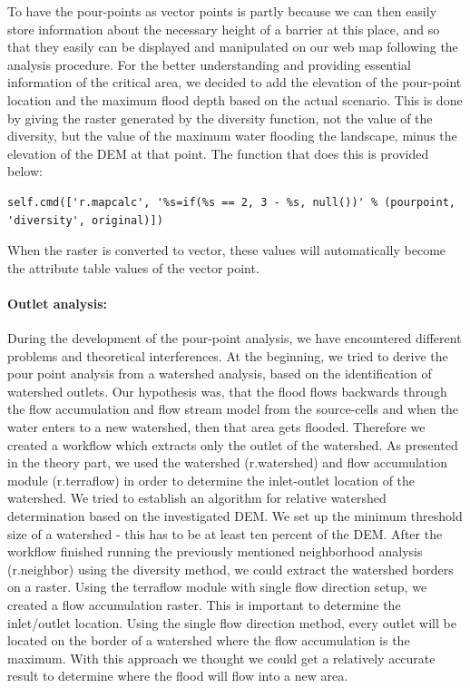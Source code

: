 To have the pour-points as vector points is partly because we can then easily store information about the necessary height of a barrier at this place, and so that they easily can be displayed and manipulated on our web map following the analysis procedure. 
For the better understanding and providing essential information of the critical area, we decided to add the elevation of the pour-point location and the maximum flood depth based on the actual scenario. This is done by giving the raster generated by the diversity function, not the value of the diversity, but the value of the maximum water flooding the landscape, minus the elevation of the DEM at that point. The function that does this is provided below:

\begin{lstlisting}
self.cmd(['r.mapcalc', '%s=if(%s == 2, 3 - %s, null())' % (pourpoint, 'diversity', original)])
\end{lstlisting}

When the raster is converted to vector, these values will automatically become the attribute table values of the vector point. \\

\paragraph{Outlet analysis:} During the development of the pour-point analysis, we have encountered different problems and theoretical interferences. At the beginning, we tried to derive the pour point analysis from a watershed analysis, based on the identification of watershed outlets. Our hypothesis was, that the flood flows backwards through the flow accumulation and flow stream model from the source-cells and when the water enters to a new watershed, then that area gets flooded. Therefore we created a workflow which extracts only the outlet of the watershed. As presented in the theory part, we used the watershed (r.watershed) and flow accumulation module (r.terraflow) in order to determine the inlet-outlet location of the watershed. We tried to establish an algorithm for relative watershed determination based on the investigated DEM. We set up the minimum threshold size of a watershed - this has to be at least ten percent of the DEM. After the workflow finished running the previously mentioned neighborhood analysis (r.neighbor) using the diversity method, we could extract the watershed borders on a raster. Using the terraflow module with single flow direction setup, we created a flow accumulation raster. This is important to determine the inlet/outlet location. Using the single flow direction method, every outlet will be located on the border of a watershed where the flow accumulation is the maximum. With this approach we thought we could get a relatively accurate result to determine where the flood will flow into a new area.\\

